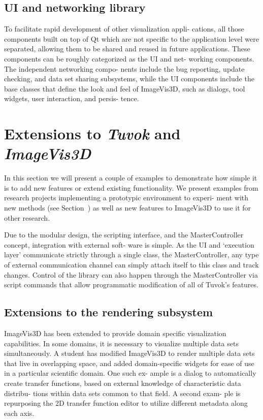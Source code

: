 \subsection{UI and networking library}

To facilitate rapid development of other visualization appli-
cations, all those components built on top of Qt which are
not specific to the application level were separated, allowing
them to be shared and reused in future applications. These
components can be roughly categorized as the UI and net-
working components. The independent networking compo-
nents include the bug reporting, update checking, and data
set sharing subsystems, while the UI components include
the base classes that define the look and feel of ImageVis3D,
such as dialogs, tool widgets, user interaction, and persis-
tence.

\section{Extensions to \textit{Tuvok} and \textit{ImageVis3D}}

In this section we will present a couple of examples to
demonstrate how simple it is to add new features or extend
existing functionality. We present examples from research
projects implementing a prototypic environment to experi-
ment with new methods (see Section~\todo{\ref{fixme}}) as well as new
features to ImageVis3D to use it for other research.

Due to the modular design, the scripting interface, and
the MasterController concept, integration with external soft-
ware is simple. As the UI and ‘execution layer’ communicate
strictly through a single class, the MasterController, any
type of external communication channel can simply attach
itself to this class and track changes. Control of the library
can also happen through the MasterController via script
commands that allow programmatic modification of all of
Tuvok’s features.

\subsection{Extensions to the rendering subsystem}

ImageVis3D has been extended to provide domain specific
visualization capabilities. In some domains, it is necessary
to visualize multiple data sets simultaneously. A student has
modified ImageVis3D to render multiple data sets that live in
overlapping space, and added domain-specific widgets for
ease of use in a particular scientific domain. One such ex-
ample is a dialog to automatically create transfer functions,
based on external knowledge of characteristic data distribu-
tions within data sets common to that field. A second exam-
ple is repurposing the 2D transfer function editor to utilize
different metadata along each axis.

